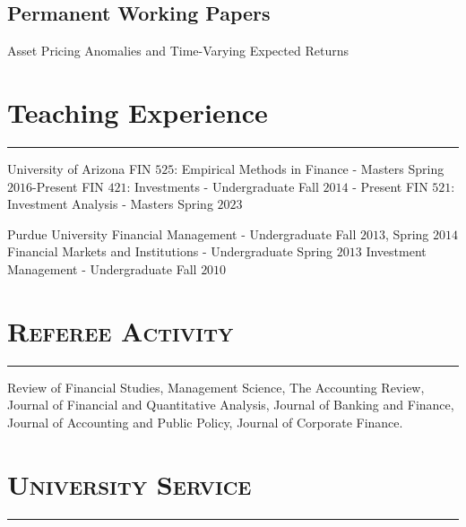 \documentclass[10pt,letterpaper]{article}
\renewenvironment{itemize}{
  \begin{list}{}{
    \setlength{\leftmargin}{1.5em}
    \setlength{\itemsep}{0.25em}
    \setlength{\parskip}{0pt}
    \setlength{\parsep}{0.25em}
  }
}{
  \end{list}
}
\begin{document}
\subsection*{Permanent Working Papers}
\begin{itemize}
\medskip
\item Asset Pricing Anomalies and Time-Varying Expected Returns
\end{itemize}


\section*{Teaching Experience}
\nointerlineskip
\vspace{-3mm}
\rule{\textwidth}{0.5mm}

\begin{itemize}
\item University of Arizona
  \subitem FIN $525$: Empirical Methods in Finance - Masters   \hfill Spring $2016$-Present
  \subitem FIN $421$: Investments - Undergraduate \hfill Fall $2014$ - Present
  \subitem FIN $521$: Investment Analysis - Masters \hfill Spring $2023$

\item Purdue University
  \subitem Financial Management - Undergraduate \hfill Fall $2013$, Spring $2014$
  \subitem Financial Markets and Institutions - Undergraduate \hfill Spring $2013$ 
  \subitem Investment Management - Undergraduate     \hfill Fall $2010$     
 \end{itemize}




\section*{\textsc{Referee Activity}}
\nointerlineskip
\vspace{-3mm}
\rule{\textwidth}{0.5mm}

\begin{itemize}
\item Review of Financial Studies, Management Science, The Accounting Review, Journal of Financial and Quantitative Analysis, Journal of Banking and Finance, Journal of Accounting and Public Policy, Journal of Corporate Finance.
\end{itemize}

\section*{\textsc{University Service}}
\nointerlineskip
\vspace{-3mm}
\rule{\textwidth}{0.5mm}
\end{document}
